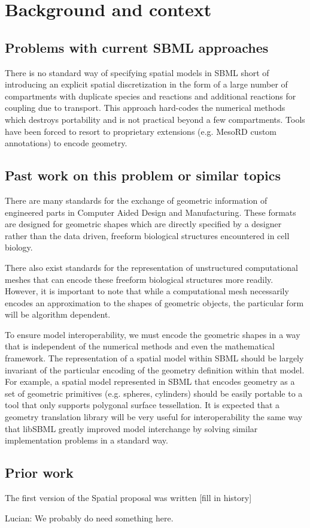 
\section{Background and context}
\label{background}

\subsection{Problems with current SBML approaches}
There is no standard way of specifying spatial models in SBML short of introducing an explicit spatial discretization in the form of a large number of compartments with duplicate species and reactions and additional reactions for coupling due to transport.  This approach hard-codes the numerical methods which destroys portability and is not practical beyond a few compartments.  Tools have been forced to resort to proprietary extensions (e.g. MesoRD custom annotations) to encode geometry. 

\subsection{Past work on this problem or similar topics}
There are many standards for the exchange of geometric information of engineered parts in Computer Aided Design and Manufacturing.  These formats are designed for geometric shapes which are directly specified by a designer rather than the data driven, freeform biological structures encountered in cell biology.  

There also exist standards for the representation of unstructured computational meshes that can encode these freeform biological structures more readily.  However, it is important to note that while a computational mesh necessarily encodes an approximation to the shapes of geometric objects, the particular form will be algorithm dependent.  

To ensure model interoperability, we must encode the geometric shapes in a way that is independent of the numerical methods and even the mathematical framework.  The representation of a spatial model within SBML should be largely invariant of the particular encoding of the geometry definition within that model.  For example, a spatial model represented in SBML that encodes geometry as a set of geometric primitives (e.g. spheres, cylinders) should be easily portable to a tool that only supports polygonal surface tessellation.  It is expected that a geometry translation library will be very useful for interoperability the same way that libSBML greatly improved model interchange by solving similar implementation problems in a standard way.

\subsection{Prior work}

The first version of the Spatial proposal was written [fill in history]

{\color{red} Lucian: \notice We probably do need something here.}
